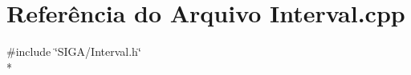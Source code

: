 \section{Referência do Arquivo Interval.\+cpp}
\label{_interval_8cpp}
{\ttfamily \#include \char`\"{}S\+I\+G\+A/\+Interval.\+h\char`\"{}}\\*
